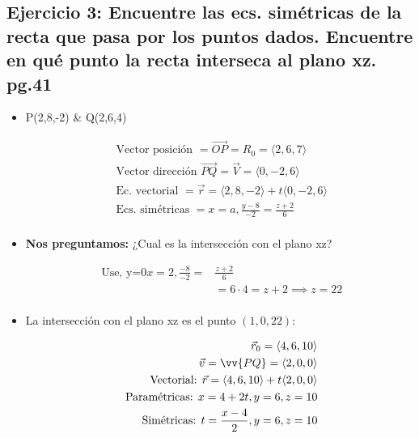 \subsection{Ejercicio 3: Encuentre las ecs. simétricas de la recta que pasa por los puntos dados. Encuentre en qué punto la recta interseca al plano xz. pg.41}
\begin{itemize}
    \item P(2,8,-2) \& Q(2,6,4) 
        \begin{center}
            \begin{align*}
                \text{  Vector posición  } = \overrightarrow{OP} = R_0 = \langle 2,6,7 \rangle \\ 
                \text{  Vector dirección  } \overrightarrow{PQ} = \vec{V} = \langle 0,-2,6 \rangle \\ 
                \text{  Ec. vectorial  } = \vec{r} = \langle 2,8,-2 \rangle + t \langle 0,-2,6 \rangle \\
                \text{  Ecs. simétricas  } = x = a, \frac{y-8}{-2} = \frac{z+2}{6} \\   
            \end{align*}
        \end{center}
    
    \item \textbf{Nos preguntamos:} ¿Cual es la intersección con el plano xz?
        \begin{center}
            \begin{align*}
                \text{  Use,  y=0} x = 2, \frac{-8}{-2} =&  \frac{z+2}{6} \\ 
                & = 6 \cdot 4 = z+ 2 \implies z= 22 \\ 
            \end{align*}
        \end{center}

    
    \item La intersección con el plano xz es el punto $(1,0,22)$: 
    \begin{center}
        \begin{align*}
            \vec{r}_0 = \langle 4,6,10 \rangle \\ 
            \vec{v} = \vv{PQ} = \langle 2,0,0 \rangle \\ 
            \text{  Vectorial:    } \vec{r} = \langle 4,6,10 \rangle + t \langle 2,0,0 \rangle \\ 
            \text{  Paramétricas: } x = 4 + 2t, y = 6, z = 10 \\ 
            \text{  Simétricas:  }t = \frac{x-4}{2} , y = 6, z=10 \\  
        \end{align*}
    \end{center}
    

\end{itemize}
